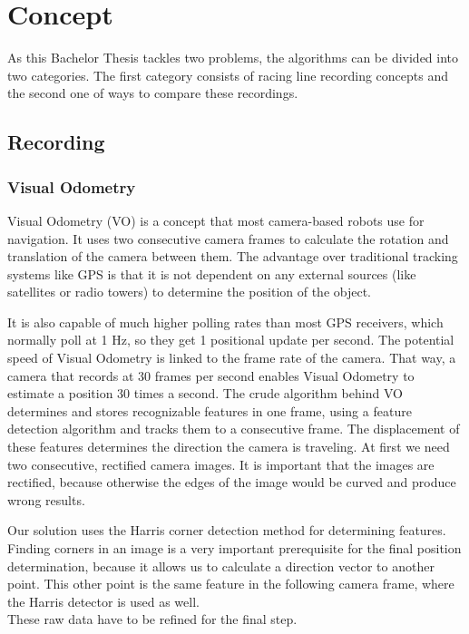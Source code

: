 \section{Concept}
\label{sec:algorithm}
\graphicspath{{utils/}}
As this Bachelor Thesis tackles two problems, the algorithms can be divided into two categories.
The first category consists of racing line recording concepts and the second one of ways to compare these recordings.

\subsection{Recording}
\subsubsection{Visual Odometry}
\label{subsec:vo}
Visual Odometry (VO) is a concept that most camera-based robots use for navigation. It uses two consecutive camera frames to calculate the rotation and translation of the camera between them. The advantage over traditional tracking systems like GPS is that it is not dependent on any external sources (like satellites or radio towers) to determine the position of the object.

It is also capable of much higher polling rates than most GPS receivers, which normally poll at 1 Hz, so they get 1 positional update per second. The potential speed of Visual Odometry is linked to the frame rate of the camera. That way, a camera that records at 30 frames per second enables Visual Odometry to estimate a position 30 times a second. 
The crude algorithm behind VO determines and stores recognizable features in one frame, using a feature detection algorithm and tracks them to a consecutive frame. The displacement of these features determines the direction the camera is traveling.
At first we need two consecutive, rectified camera images. It is important that the images are rectified, because otherwise the edges of the image would be curved and produce wrong results.

Our solution uses the Harris corner detection method \cite{harris88} for determining features. Finding corners in an image is a very important prerequisite for the final position determination, because it allows us to calculate a direction vector to another point. This other point is the same feature in the following camera frame, where the Harris detector is used as well.\\
These raw data have to be refined for the final step.

